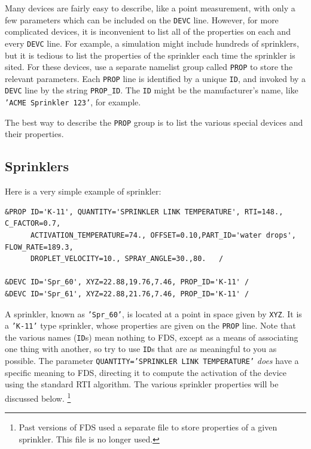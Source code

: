 \documentclass[11pt]{book}
\newcommand{\ct}{\tt\small}
\begin{document}
Many devices are fairly easy to describe, like a point measurement, with only a few parameters which can be included on the
{\ct DEVC} line. However, for more complicated devices, it is inconvenient to list all of the properties on each and every
{\ct DEVC} line. For example, a simulation might include hundreds of sprinklers, but it is tedious to list the properties of the
sprinkler each time the sprinkler is sited. For these devices, use a separate namelist group called {\ct PROP} to store the relevant parameters.
Each {\ct PROP} line is identified by a unique {\ct ID}, and invoked by a {\ct DEVC} line by the string {\ct PROP\_ID}.
The {\ct ID} might be the manufacturer's
name, like {\ct 'ACME Sprinkler 123'}, for example.

The best way to describe the {\ct PROP} group is to list the various special devices and their properties.


\subsection{Sprinklers}
\label{info:sprinklers}
 

Here is a very simple example of sprinkler:

\footnotesize
\begin{verbatim}
&PROP ID='K-11', QUANTITY='SPRINKLER LINK TEMPERATURE', RTI=148., C_FACTOR=0.7,
      ACTIVATION_TEMPERATURE=74., OFFSET=0.10,PART_ID='water drops', FLOW_RATE=189.3,
      DROPLET_VELOCITY=10., SPRAY_ANGLE=30.,80.   /

&DEVC ID='Spr_60', XYZ=22.88,19.76,7.46, PROP_ID='K-11' /
&DEVC ID='Spr_61', XYZ=22.88,21.76,7.46, PROP_ID='K-11' /
\end{verbatim} \normalsize

\noindent
A sprinkler, known as {\ct 'Spr\_60'}, is located at a point in space given by {\ct XYZ}. It is a {\ct 'K-11'} type sprinkler, whose properties are given on
the {\ct PROP} line. Note that the various names ({\ct ID}s) mean nothing to FDS, except as a means of associating one thing with another, so try to use {\ct ID}s that are as
meaningful to you as possible.  The parameter {\ct QUANTITY='SPRINKLER LINK TEMPERATURE'} {\em does} have a specific meaning to FDS, directing it to compute the activation of
the device using the standard RTI algorithm. The various sprinkler properties will be discussed below.
\footnote{Past versions of FDS used a separate file to store
properties of a given sprinkler. This file is no longer used.}
\end{document}

